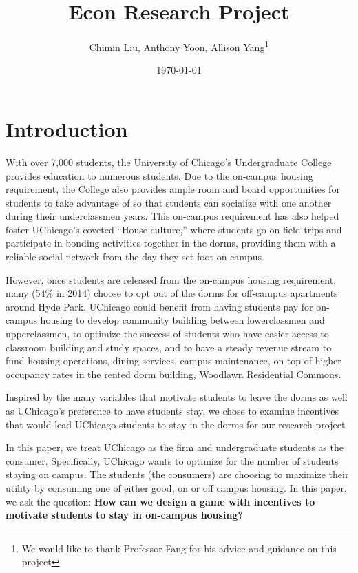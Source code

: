 \documentclass[12pt]{article}
\title{Econ Research Project}
\author{Chimin Liu, Anthony Yoon, Allison Yang\thanks{We would like to thank Professor Fang for his advice and guidance on this project}}
\date{\today}
\begin{document}
\maketitle
\tableofcontents
\newpage
\section{Introduction}
With over 7,000 students, the University of Chicago’s Undergraduate College provides education to numerous students. Due to the on-campus housing requirement, the College also provides ample room and board opportunities for students to take advantage of so that students can socialize with one another during their underclassmen years. This on-campus requirement has also helped foster UChicago’s coveted “House culture,” where students go on field trips and participate in bonding activities together in the dorms, providing them with a reliable social network from the day they set foot on campus.


However, once students are released from the on-campus housing requirement, many (54\% in 2014) choose to opt out of the dorms for off-campus apartments around Hyde Park. UChicago could benefit from having students pay for on-campus housing to develop community building between lowerclassmen and upperclassmen, to optimize the success of students who have easier access to classroom building and study spaces, and to have a steady revenue stream to fund housing operations, dining services, campus maintenance, on top of higher occupancy rates in the rented dorm building, Woodlawn Residential Commons. 


Inspired by the many variables that motivate students to leave the dorms as well as UChicago’s preference to have students stay, we chose to examine incentives that would lead UChicago students to stay in the dorms for our research project


In this paper, we treat UChicago as the firm and undergraduate students as the consumer. Specifically, UChicago wants to optimize for the number of students staying on campus. The students (the consumers) are choosing to maximize their utility by consuming one of either good, on or off campus housing. In this paper, we ask the question: \textbf{How can we design a game with incentives to motivate students to stay in on-campus housing?}
\end{document}

